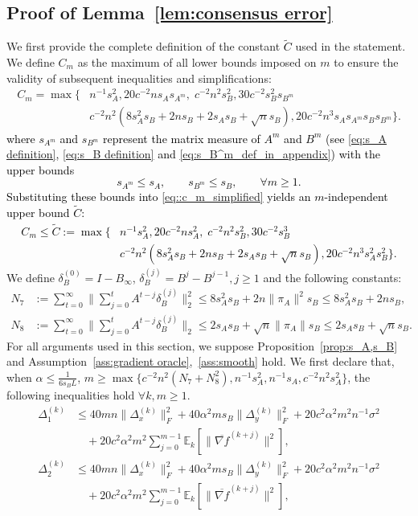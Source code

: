 \documentclass[10pt]{article}
\newcommand{\EE}{\mathbb{E}}
\newcommand{\norm}[1]{\| #1 \|}
\newcommand{\revision}[1]{\textcolor{black}{#1}}
\begin{document}
\subsection{Proof of Lemma~\ref{lem:consensus error}}\label{app:subsec:lem 4.4}
We first provide the complete definition of the constant \revision{$\tilde{C}$} used in the statement. We define $C_m$ as the maximum of all lower bounds imposed on $m$ to ensure the validity of subsequent inequalities and simplifications: 
\begin{align}\label{eq::c_m_simplified}
C_m = \max \Big\{ 
    & n^{-1}s_A^2, 20c^{-2}ns_A s_{A^m},\;c^{-2}n^2s_B^2,  30c^{-2}s_B^2s_{B^m}\nonumber\\
    & c^{-2}n^2(8s_A^2s_B+2ns_B+2s_As_B+\sqrt{n}s_B), 20c^{-2}n^3s_A s_{A^m} s_B s_{B^m} 
\Big\}.
\end{align}
\revision{
where $s_{A^m}$ and $s_{B^m}$ represent the matrix measure of $A^m$ and $B^m$ (see \eqref{eq:s_A definition}, \eqref{eq:s_B definition} and \eqref{eq:s_B^m_def_in_appendix}) with the upper bounds
\[
s_{A^m}\le s_A,\qquad s_{B^m}\le s_B,\qquad \forall m\ge 1.
\] 
Substituting these bounds into \eqref{eq::c_m_simplified} yields an $m$-independent upper bound $\tilde{C}$:
\begin{align}\label{eq::tilde_c_m_simplified}
C_m\leq \tilde{C} := \max \Big\{ 
    & n^{-1}s_A^2, 20c^{-2}ns_A^2,\;c^{-2}n^2s_B^2,  30c^{-2}s_B^3\nonumber\\
    & c^{-2}n^2(8s_A^2s_B+2ns_B+2s_As_B+\sqrt{n}s_B), 20c^{-2}n^3s_A^2s_B^2
\Big\}.
\end{align}
}
We define $\delta_B^{(0)}=I-B_\infty$, $\delta_B^{(j)}=B^{j}-B^{j-1},j\ge 1$ and the following constants:
\begin{align*}
N_7&:=\sum_{t=0}^\infty \norm{\sum_{j=0}^t A^{t-j}\delta_B^{(j)}}_2^2 \leq 8s_A^2s_B+2n\norm{\pi_A}^2s_B\leq 8s_A^2s_B+2ns_B,\\
    N_8&:=\sum_{t=0}^\infty \norm{\sum_{j=0}^t A^{t-j}\delta_B^{(j)}}_2 \leq 2s_As_B+\sqrt{n}\norm{\pi_A}s_B\leq 2s_As_B+\sqrt{n}s_B.
\end{align*}
For all arguments used in this section, we suppose Proposition~\ref{prop:s_A,s_B} and Assumption~\ref{ass:gradient oracle},~\ref{ass:smooth} hold. We first declare that, when $\alpha \le \frac{1}{6s_BL}$, $m\ge \max\{c^{-2}n^2(N_7+N_8^2),n^{-1}s_A^2, n^{-1}s_A, c^{-2}n^2s_A^2\}$, the following inequalities hold $\forall k,m \ge 1$.
    \begin{align}
    \Delta_1^{(k)} &\le 40mn\norm{\Delta_x^{(k)}}_F^2+ 40\alpha^2ms_B\norm{\Delta_y^{(k)}}_F^2+20c^2\alpha^2 m^2n^{-1}\sigma^2\label{ieq:delta 1}\\
    &\quad+20c^2\alpha^2m^2\sum_{j=0}^{m-1}\EE_k[\norm{\overline{\nabla f}^{(k+j)}}^2],\nonumber\\
    \Delta_2^{(k)}&\le 40mn\norm{\Delta_x^{(k)}}_F^2+ 40\alpha^2ms_B\norm{\Delta_y^{(k)}}_F^2+20c^2\alpha^2 m^2n^{-1}\sigma^2\label{ieq:delta 2}\\
    &\quad+20c^2\alpha^2m^2\sum_{j=0}^{m-1}\EE_k[\norm{\overline{\nabla f}^{(k+j)}}^2],\nonumber
\end{align}
\end{document}
